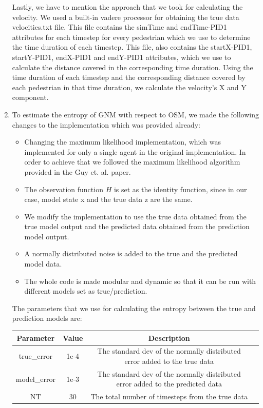 \documentclass[10pt,a4paper]{article}
\begin{document}
\begin{enumerate}
	Lastly, we have to mention the approach that we took for calculating the velocity. We used a built-in vadere processor for obtaining the true data velocities.txt file. This file contains the simTime and endTime-PID1 attributes for each timestep for every pedestrian which we use to determine the time duration of each timestep. This file, also contains the startX-PID1, startY-PID1, endX-PID1 and endY-PID1 attributes, which we use to calculate the distance covered in the corresponding time duration. Using the time duration of each timestep and the corresponding distance covered by each pedestrian in that time duration, we calculate the velocity's X and Y component. 
	\item To estimate the entropy of GNM with respect to OSM, we made the following changes to the implementation which was provided already:
	\begin{itemize}
		\item Changing the maximum likelihood implementation, which was implemented for only a single agent in the original implementation. In order to achieve that we followed the maximum likelihood algorithm provided in the Guy et. al. paper. 
		\item The observation function $H$ is set as the identity function, since in our case, model state x and the true data z are the same.
		\item We modify the implementation to use the true data obtained from the true model output and the predicted data obtained from the prediction model output.
		\item A normally distributed noise is added to the true and the predicted model data.
		\item The whole code is made modular and dynamic so that it can be run with different models set as true/prediction. 
	\end{itemize}
	The parameters that we use for calculating the entropy between the true and prediction models are:
	 \begin{center}
	\begin{tabular}{ |c|c|c|c| } 
	\hline
	Parameter & Value & Description \\
	\hline\hline
	true\_error & 1e-4 & The standard dev of the normally distributed error added to the true data \\ 
	model\_error & 1e-3 & The standard dev of the normally distributed error added to the predicted data \\ 
	NT & 30 & The total number of timesteps from the true data \\ 

\end{tabular}
\end{center}
\end{enumerate}
\end{document}
